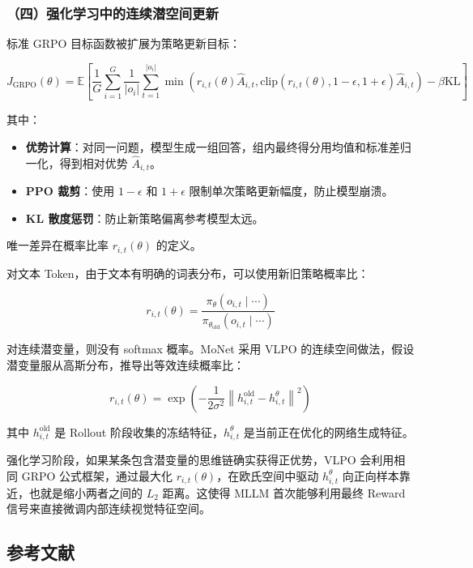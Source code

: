 \hypertarget{ux56dbux5f3aux5316ux5b66ux4e60ux4e2dux7684ux8fdeux7eedux6f5cux7a7aux95f4ux66f4ux65b0}{%
\subsubsection{（四）强化学习中的连续潜空间更新}\label{ux56dbux5f3aux5316ux5b66ux4e60ux4e2dux7684ux8fdeux7eedux6f5cux7a7aux95f4ux66f4ux65b0}}

标准 GRPO 目标函数被扩展为策略更新目标：

\[
J_{\text{GRPO}}(\theta) =
\mathbb{E}\left[
\frac{1}{G}\sum_{i=1}^{G}\frac{1}{|o_i|}
\sum_{t=1}^{|o_i|}
\min\left(
r_{i,t}(\theta)\hat A_{i,t},
\mathrm{clip}(r_{i,t}(\theta),1-\epsilon,1+\epsilon)\hat A_{i,t}
\right)
-\beta\mathrm{KL}
\right]
\]

其中：

\begin{itemize}
\tightlist
\item
  \textbf{优势计算}：对同一问题，模型生成一组回答，组内最终得分用均值和标准差归一化，得到相对优势 \(\hat A_{i,t}\)。
\item
  \textbf{PPO 裁剪}：使用 \(1-\epsilon\) 和 \(1+\epsilon\) 限制单次策略更新幅度，防止模型崩溃。
\item
  \textbf{KL 散度惩罚}：防止新策略偏离参考模型太远。
\end{itemize}

唯一差异在概率比率 \(r_{i,t}(\theta)\) 的定义。

对文本 Token，由于文本有明确的词表分布，可以使用新旧策略概率比：

\[
r_{i,t}(\theta) =
\frac{\pi_{\theta}(o_{i,t}\mid\cdots)}
{\pi_{\theta_{\text{old}}}(o_{i,t}\mid\cdots)}
\]

对连续潜变量，则没有 softmax 概率。MoNet 采用 VLPO 的连续空间做法，假设潜变量服从高斯分布，推导出等效连续概率比：

\[
r_{i,t}(\theta) =
\exp\left(
-\frac{1}{2\sigma^2}
\left\lVert h_{i,t}^{\text{old}}-h_{i,t}^{\theta}\right\rVert^2
\right)
\]

其中 \(h_{i,t}^{\text{old}}\) 是 Rollout 阶段收集的冻结特征，\(h_{i,t}^{\theta}\) 是当前正在优化的网络生成特征。

强化学习阶段，如果某条包含潜变量的思维链确实获得正优势，VLPO 会利用相同 GRPO 公式框架，通过最大化 \(r_{i,t}(\theta)\)，在欧氏空间中驱动 \(h_{i,t}^{\theta}\) 向正向样本靠近，也就是缩小两者之间的 \(L_2\) 距离。这使得 MLLM 首次能够利用最终 Reward 信号来直接微调内部连续视觉特征空间。

\hypertarget{ux53c2ux8003ux6587ux732e-196}{%
\subsection{参考文献}\label{ux53c2ux8003ux6587ux732e-196}}

